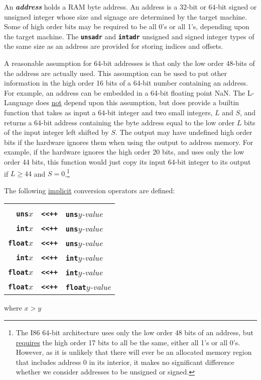 \documentclass[12pt]{article}
\newcommand{\TT}[1]{{\tt \bfseries #1}}
\newcommand{\key}[1]{{\bf \em #1}\index{#1}}
\begin{document}
An \key{address} holds a RAM byte address.
An address is a 32-bit or 64-bit signed or unsigned integer whose size
and signage are determined by the target machine.
Some of high order bits may be
required to be all 0's or all 1's, depending upon
the target machine.  The \TT{unsadr} and \TT{intadr}
unsigned and signed integer types of the same size
as an address are provided for storing indices and offsets.

A reasonable assumption for 64-bit addresses is that only the low
order 48-bits of the address are actually used.  This assumption can
be used to put other information in the high order 16 bits
of a 64-bit number containing an address.  For example, an address
can be embedded in a 64-bit floating point NaN.  The L-Language does
\underline{not} depend upon this assumption, but does provide a builtin function
that takes as input a 64-bit integer and two small integers, $L$ and $S$,
and returns a 64-bit address containing
the byte address equal to the low order $L$ bits of the input integer
left shifted by $S$.  The output may have undefined high order bits if
the hardware ignores them when using the output to address memory.
For example, if the hardware ignores the high order 20 bits, and uses only the
low order 44 bits,
this function would just copy its input 64-bit integer to its output
if $L\geq 44$ and $S=0$.\footnote{The I86 64-bit architecture
uses only the low order 48 bits of an address, but \underline{requires}
the high order 17 bits to all be the same, either all 1's or all 0's.
However, as it is unlikely that there will ever be an allocated memory region
that includes address 0 in its interior, it makes no significant difference
whether we consider addresses to be unsigned or signed.}

The following \underline{implicit} conversion operators are defined:
\begin{center}

\begin{tabular}{rcl}
\hspace*{2.0in} & & \hspace*{2.0in} \\[-2ex]
\TT{uns}$x$ & \TT{<{}<++} & \TT{uns}$y${\em -value} \\
\TT{int}$x$ & \TT{<{}<++} & \TT{uns}$y${\em -value} \\
\TT{float}$x$ & \TT{<{}<++} & \TT{uns}$y${\em -value} \\
\TT{int}$x$ & \TT{<{}<++} & \TT{int}$y${\em -value} \\
\TT{float}$x$ & \TT{<{}<++} & \TT{int}$y${\em -value} \\
\TT{float}$x$ & \TT{<{}<++} & \TT{float}$y${\em -value} \\
\end{tabular}

where $x>y$

\end{center}
\end{document}
